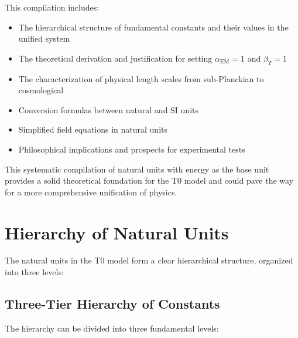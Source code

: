 \documentclass[12pt,a4paper]{article}
\begin{document}
	This compilation includes:
	\begin{itemize}
		\item The hierarchical structure of fundamental constants and their values in the unified system
		\item The theoretical derivation and justification for setting $\alpha_{\text{EM}} = 1$ and $\beta_T = 1$
		\item The characterization of physical length scales from sub-Planckian to cosmological
		\item Conversion formulas between natural and SI units
		\item Simplified field equations in natural units
		\item Philosophical implications and prospects for experimental tests
	\end{itemize}
	
	This systematic compilation of natural units with energy as the base unit provides a solid theoretical foundation for the T0 model and could pave the way for a more comprehensive unification of physics.
	
	\section{Hierarchy of Natural Units}
	
	The natural units in the T0 model form a clear hierarchical structure, organized into three levels:
	
	\subsection{Three-Tier Hierarchy of Constants}
	
	The hierarchy can be divided into three fundamental levels:
	
\end{document}
